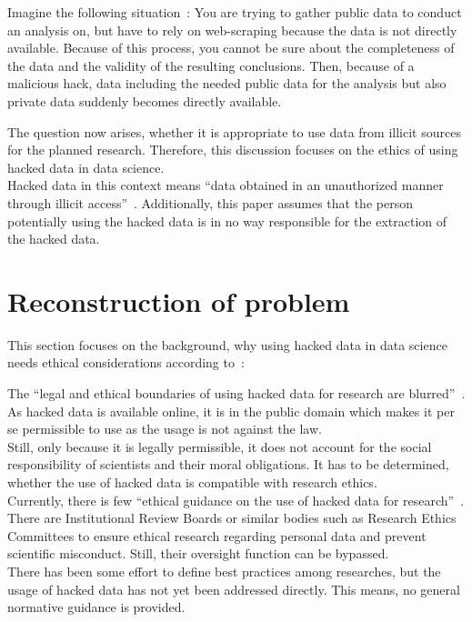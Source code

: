 
Imagine the following situation~\parencite[][1-2]{patreon}:
You are trying to gather public data to conduct an analysis on, but have to rely on web-scraping because the data is not directly available.
Because of this process, you cannot be sure about the completeness of the data and the validity of the resulting conclusions.
Then, because of a malicious hack, data including the needed public data for the analysis but also private data suddenly becomes directly available.

The question now arises, whether it is appropriate to use data from illicit sources for the planned research.
Therefore, this discussion focuses on the ethics of using hacked data in data science.\\
Hacked data in this context means ``data obtained in an unauthorized manner through illicit access''~\parencite[][744]{nature}.
Additionally, this paper assumes that the person potentially using the hacked data is in no way responsible for the extraction of the hacked data.

\section*{Reconstruction of problem}

This section focuses on the background, why using hacked data in data science needs ethical considerations according to~\textcite[][745]{nature}:

The ``legal and ethical boundaries of using hacked data for research are blurred''~\parencite[][745]{nature}.
As hacked data is available online, it is in the public domain which makes it per se permissible to use as the usage is not against the law.\\
Still, only because it is legally permissible, it does not account for the social responsibility of scientists and their moral obligations.
It has to be determined, whether the use of hacked data is compatible with research ethics.\\
Currently, there is few ``ethical guidance on the use of hacked data for research''~\parencite[][745]{nature}.
There are Institutional Review Boards or similar bodies such as Research Ethics Committees to ensure ethical research regarding personal data and prevent scientific misconduct.
Still, their oversight function can be bypassed.\\
There has been some effort to define best practices among researches, but the usage of hacked data has not yet been addressed directly.
This means, no general normative guidance is provided.

